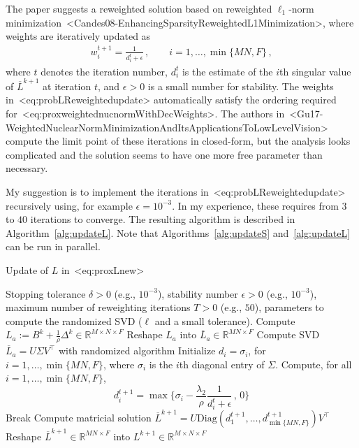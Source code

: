\documentclass[a4paper,11pt]{article}
\def\cite#1{<#1>}%
\def\eqref#1{<#1>}%
\begin{document}
The paper suggests a reweighted solution based on reweighted $\ell_1$-norm
minimization~\cite{Candes08-EnhancingSparsityReweightedL1Minimization}, where
weights are iteratively updated as
\begin{align}
  \label{eq:probLReweightedupdate}
  w_i^{t+1} = \frac{1}{d_i^t + \epsilon}\,,\qquad
  i = 1, \ldots, \min\{MN, F\}\,,
\end{align}
where $t$ denotes the iteration number, $d_i^t$ is the estimate of
the $i$th singular value of $\overline{L}^{k+1}$ at iteration $t$, and $\epsilon > 0$ is a small number for
stability.
The weights in~\eqref{eq:probLReweightedupdate} automatically satisfy the
ordering required for~\eqref{eq:proxweightednucnormWithDecWeights}. 
The authors
in~\cite{Gu17-WeightedNuclearNormMinimizationAndItsApplicationsToLowLevelVision}
compute the limit point of these iterations in closed-form, but the analysis
looks complicated and the solution seems to have one more free parameter than
necessary. 

My suggestion is to implement the iterations
in~\eqref{eq:probLReweightedupdate} recursively using, for example $\epsilon =
10^{-3}$. In my experience, these requires from $3$ to $40$ iterations to
converge. The resulting algorithm is described in Algorithm~\ref{alg:updateL}.
Note that Algorithms~\ref{alg:updateS} and~\ref{alg:updateL} can be run in
parallel.

\begin{algorithm}
  \caption{Update of $L$ in~\eqref{eq:proxLnew}}
  \label{alg:updateL}
  \begin{algorithmic}[1]
  \algrenewcommand{}
  \Require Stopping tolerance $\delta > 0$ (e.g., $10^{-3}$), stability number $\epsilon > 0$ (e.g., $10^{-3}$), maximum number of
  reweighting iterations $T > 0$ (e.g., $50$), parameters to compute the
  randomized SVD ($\ell$ and a small tolerance).
  \State Compute $L_a := B^k + \frac{1}{\rho}\Delta^k \in \mathbb{R}^{M\times N\times F}$
  \State Reshape $L_a$ into $\overline{L}_a \in \mathbb{R}^{MN \times F}$
  \State Compute SVD $\overline{L}_a = U \Sigma V^\top$ with randomized
  algorithm
  \State Initialize $d_i = \sigma_i$, for $i = 1, \ldots, \min\{MN, F\}$, where
  $\sigma_i$ is the $i$th diagonal entry of $\Sigma$.
    \State Compute, for all $i = 1, \ldots, \min\{MN, F\}$, 
    $$
    d_i^{t+1} = \max\Big\{\sigma_i - \frac{\lambda_2}{\rho}\frac{1}{d_i^t + \epsilon}\, ,\, 0\Big\}
    $$
      \State Break
    \EndIf
  \EndFor
  \State Compute matricial solution $\overline{L}^{k+1} = U
  \text{Diag}(d_1^{t+1}, \ldots, d_{\min\{MN, F\}}^{t+1}) V^\top$
  \State Reshape $\overline{L}^{k+1} \in \mathbb{R}^{MN \times F}$ into
  $L^{k+1} \in \mathbb{R}^{M\times N\times F}$
  \end{algorithmic}
\end{algorithm}
\end{document}
